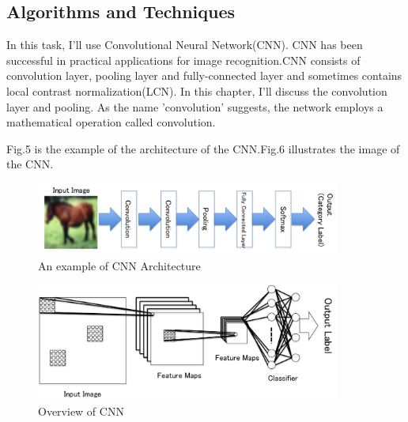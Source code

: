 \subsection{Algorithms and Techniques}

In this task, I'll use Convolutional Neural Network(CNN). CNN has been successful in  practical applications for image recognition.CNN consists of convolution layer, pooling layer and fully-connected layer and sometimes contains local contrast normalization(LCN). In this chapter, I'll discuss the convolution layer and pooling.
As the name 'convolution' suggests, the network employs a mathematical operation called convolution. \cite{Deep Learning}\cite{Deep Learning2}

Fig.5 is the example of the architecture of the CNN.Fig.6 illustrates the image of the CNN.\cite{Machine Learning}

\begin{figure}[htbp]

	\begin{center}
	\includegraphics[width=10cm]{picture/Architecture_of_CNN.png}
	\caption{An example of CNN Architecture}
	\end{center}
	\label{fig:five}

\end{figure}



\begin{figure}[htbp]

	\begin{center}
	\includegraphics[width=10cm]{picture/Structure_of_convolution.png}
	\caption{Overview of CNN}
	\end{center}
	\label{fig:six}

\end{figure}

